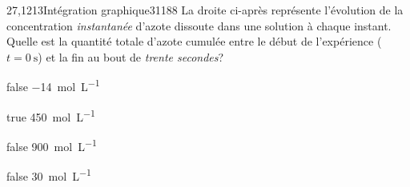 \documentclass[11pt]{article}
\begin{document}
        \begin{question}{27,1213}{Intégration graphique}{3}{1188}
            La droite ci-après représente l'évolution de la concentration \emph{instantanée} d'azote dissoute dans une solution à chaque instant. Quelle est la quantité totale d'azote cumulée entre le début de l'expérience ($t=\SI{0}{\second}$) et la fin au bout de \emph{trente secondes}?
            \begin{figure}
             \end{figure}
        \end{question}
        \begin{reponses}
            \item[false] \SI{-14}{\mol\per\liter}
		    \item[true] \SI{450}{\mol\per\liter}
		    \item[false] \SI{900}{\mol\per\liter}
		    \item[false] \SI{30}{\mol\per\liter}
		    \end{reponses}
        
\end{document}
